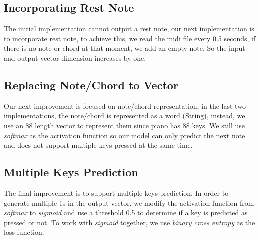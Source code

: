 \documentclass[conference]{IEEEtran}
\begin{document}
\subsection{Incorporating Rest Note}
The initial implementation cannot output a rest note, our next implementation is to incorporate rest note, to achieve this, we read the midi file every 0.5 seconds, if there is no note or chord at that moment, we add an empty note. So the input and output vector dimension increases by one.

\subsection{Replacing Note/Chord to Vector}
Our next improvement is focused on note/chord representation, in the last two implementations, the note/chord is represented as a word (String), instead, we use an 88 length vector to represent them since piano has 88 keys. We still use \textit{softmax} as the activation function so our model can only predict the next note and does not support multiple keys pressed at the same time.

\subsection{Multiple Keys Prediction}
The final improvement is to support multiple keys prediction. In order to generate multiple 1s in the output vector, we modify the activation function from \textit{softmax} to \textit{sigmoid} and use a threshold 0.5 to determine if a key is predicted as pressed or not. To work with \textit{sigmoid} together, we use \textit{binary cross entropy} as the loss function.
\end{document}
